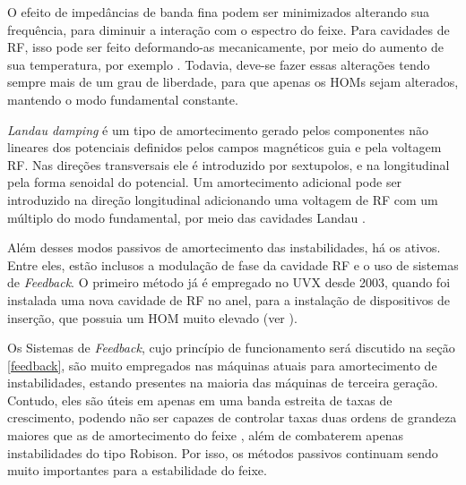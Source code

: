 O efeito de impedâncias de banda fina podem ser minimizados alterando sua frequência, para diminuir a interação com o espectro do feixe. Para cavidades de RF, isso pode ser feito deformando-as mecanicamente, por meio do aumento de sua temperatura, por exemplo \cite{112Khan}. Todavia, deve-se fazer essas alterações tendo sempre mais de um grau de liberdade, para que apenas os HOMs sejam alterados, mantendo o modo fundamental constante.

\textit{Landau damping} é um tipo de amortecimento gerado pelos componentes não lineares dos potenciais definidos pelos campos magnéticos guia e pela voltagem RF. Nas direções transversais ele é introduzido por sextupolos, e na longitudinal pela forma senoidal do potencial. Um amortecimento adicional pode ser introduzido na direção longitudinal adicionando uma voltagem de RF com um múltiplo do modo fundamental, por meio das cavidades Landau \cite{114Khan}.

Além desses modos passivos de amortecimento das instabilidades, há os ativos. Entre eles, estão inclusos a modulação de fase da cavidade RF e o uso de  sistemas de \textit{Feedback}. O primeiro método já é empregado no UVX desde 2003, quando foi instalada uma nova cavidade de RF no anel, para a instalação de dispositivos de inserção, que possuia um HOM muito elevado (ver \cite{rfUVX}).

Os Sistemas de \textit{Feedback}, cujo princípio de funcionamento será discutido na seção \ref{feedback}, são muito empregados nas máquinas atuais para amortecimento de instabilidades, estando presentes na maioria das máquinas de terceira geração. Contudo, eles são úteis em apenas em uma banda estreita de taxas de crescimento, podendo não ser capazes de controlar taxas duas ordens de grandeza maiores que as de amortecimento do feixe \cite{Khan}, além de combaterem apenas instabilidades do tipo Robison. Por isso, os métodos passivos continuam sendo muito importantes para a estabilidade do feixe.